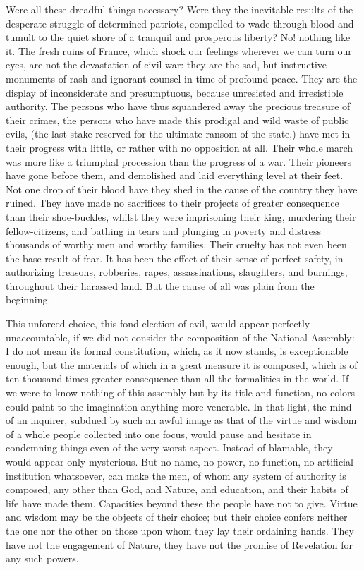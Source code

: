 Were all these dreadful things necessary? Were they the inevitable results of the desperate struggle of determined patriots, compelled to wade through blood and tumult to the quiet shore of a tranquil and prosperous liberty? No! nothing like it. The fresh ruins of France, which shock our feelings wherever we can turn our eyes, are not the devastation of civil war: they are the sad, but instructive monuments of rash and ignorant counsel in time of profound peace. They are the display of inconsiderate and presumptuous, because unresisted and irresistible authority. The persons who have thus squandered away the precious treasure of their crimes, the persons who have made this prodigal and wild waste of public evils, (the last stake reserved for the ultimate ransom of the state,) have met in their progress with little, or rather with no opposition at all. Their whole march was more like a triumphal procession than the progress of a war. Their pioneers have gone before them, and demolished and laid everything level at their feet. Not one drop of their blood have they shed in the cause of the country they have ruined. They have made no sacrifices to their projects of greater consequence than their shoe-buckles, whilst they were imprisoning their king, murdering their fellow-citizens, and bathing in tears and plunging in poverty and distress thousands of worthy men and worthy families. Their cruelty has not even been the base result of fear. It has been the effect of their sense of perfect safety, in authorizing treasons, robberies, rapes, assassinations, slaughters, and burnings, throughout their harassed land. But the cause of all was plain from the beginning.

This unforced choice, this fond election of evil, would appear perfectly unaccountable, if we did not consider the composition of the National Assembly: I do not mean its formal constitution, which, as it now stands, is exceptionable enough, but the materials of which in a great measure it is composed, which is of ten thousand times greater consequence than all the formalities in the world. If we were to know nothing of this assembly but by its title and function, no colors could paint to the imagination anything more venerable. In that light, the mind of an inquirer, subdued by such an awful image as that of the virtue and wisdom of a whole people collected into one focus, would pause and hesitate in condemning things even of the very worst aspect. Instead of blamable, they would appear only mysterious. But no name, no power, no function, no artificial institution whatsoever, can make the men, of whom any system of authority is composed, any other than God, and Nature, and education, and their habits of life have made them. Capacities beyond these the people have not to give. Virtue and wisdom may be the objects of their choice; but their choice confers neither the one nor the other on those upon whom they lay their ordaining hands. They have not the engagement of Nature, they have not the promise of Revelation for any such powers.

